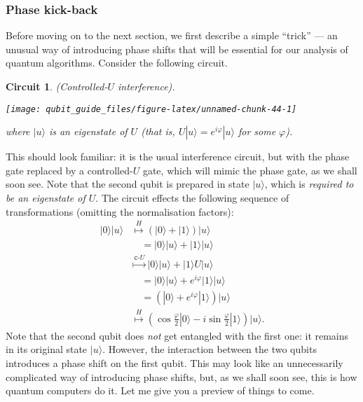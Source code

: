 \documentclass[fleqn]{article}
\newtheorem*{circuit}{Circuit}
\begin{document}
\hypertarget{phase-kick-back}{%
\subsubsection{Phase kick-back}\label{phase-kick-back}}

Before moving on to the next section, we first describe a simple ``trick'' --- an unusual way of introducing phase shifts that will be essential for our analysis of quantum algorithms.
Consider the following circuit.

\begin{circuit}

(Controlled-\(U\) interference).

\begin{center}\texttt{[image: qubit\_guide\_files/figure-latex/unnamed-chunk-44-1]} \end{center}

where \(|u\rangle\) is an \emph{eigenstate} of \(U\) (that is, \(U|u\rangle = e^{i\varphi}|u\rangle\) for some \(\varphi\)).


\end{circuit}

This should look familiar: it is the usual interference circuit, but with the phase gate replaced by a controlled-\(U\) gate, which will mimic the phase gate, as we shall soon see.
Note that the second qubit is prepared in state \(|u\rangle\), which is \emph{required to be an eigenstate of \(U\)}.
The circuit effects the following sequence of transformations (omitting the normalisation factors):
\[
  \begin{aligned}
    |0\rangle|u\rangle
    &\overset{H}{\longmapsto}
    (|0\rangle+|1\rangle)|u\rangle
  \\&\quad = |0\rangle|u\rangle + |1\rangle|u\rangle
  \\&\overset{\texttt{c-}U}{\longmapsto}
    |0\rangle|u\rangle + |1\rangle U|u\rangle
  \\&\quad = |0\rangle|u\rangle + e^{i\varphi}|1\rangle|u\rangle
  \\&\quad = (|0\rangle + e^{i\varphi}|1\rangle) |u\rangle
  \\&\overset{H}{\longmapsto}
    \left(
      \cos\frac{\varphi}{2}|0\rangle
      - i\sin\frac{\varphi}{2}|1\rangle
    \right) |u\rangle.
  \end{aligned}
\]
Note that the second qubit does \emph{not} get entangled with the first one: it remains in its original state \(|u\rangle\).
However, the interaction between the two qubits introduces a phase shift on the first qubit.
This may look like an unnecessarily complicated way of introducing phase shifts, but, as we shall soon see, this is how quantum computers do it.
Let me give you a preview of things to come.
\end{document}

